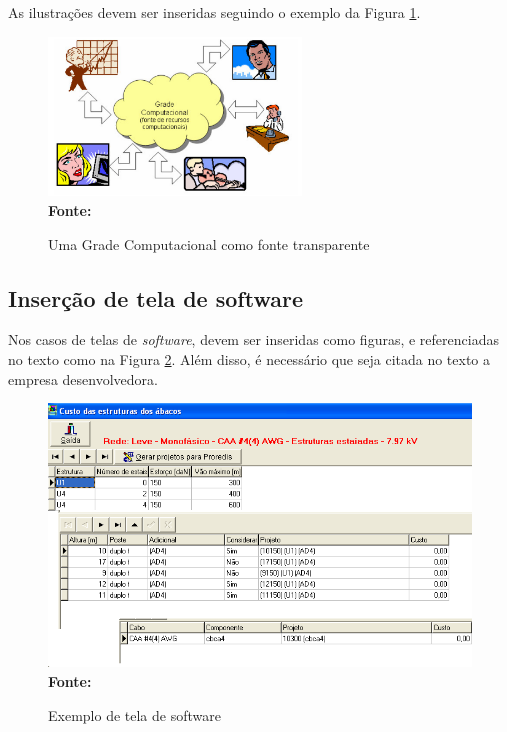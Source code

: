 As ilustrações devem ser inseridas seguindo o exemplo da Figura \ref{fig:figura1}.
\begin{figure}[ht]
	\centering
	\caption[\hspace{0.1cm}Grade Computacional.]{Uma Grade Computacional como fonte transparente}
	\vspace{-0.4cm}
	\includegraphics[width=0.6\textwidth]{figuras/grade-comp.png}
	\vspace{-0.2cm}
	\\\textbf{\footnotesize Fonte: \cite{cap-livro} }
	\label{fig:figura1}
\end{figure}
\vspace{-0.5cm}

\subsection{\esp Inserção de tela de software}

Nos casos de telas de \textit{software}, devem ser inseridas como figuras, e referenciadas no texto
como na Figura \ref{fig:tela1}. Além disso, é necessário que seja citada no texto a empresa desenvolvedora.

\begin{figure}[!ht]
	\centering
	\caption[\hspace{0.1cm}Exemplo de tela de software.]{Exemplo de tela de software}
	\vspace{-0.4cm}
	\includegraphics[width=.8\textwidth]{figuras/tela1.png}
	\vspace{-0.3cm}
	\\\textbf{\footnotesize Fonte: \cite{tela1}}
	\label{fig:tela1}
\end{figure}


